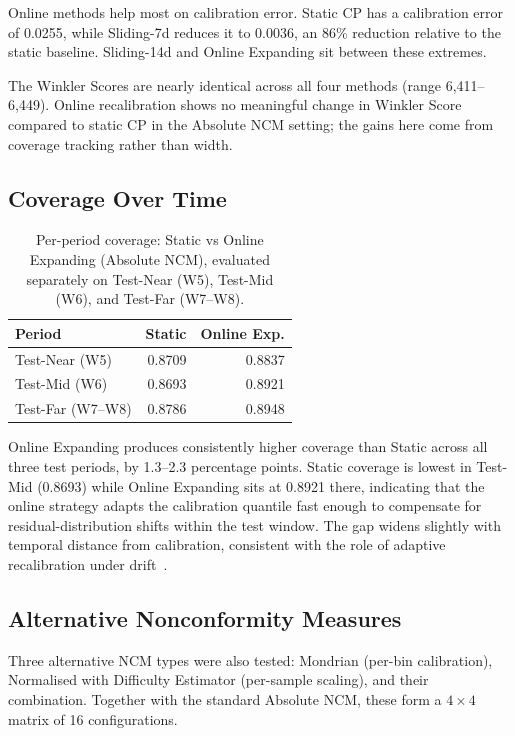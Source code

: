 \documentclass[12pt, a4paper, oneside]{report}
\begin{document}
Online methods help most on calibration error. Static CP has a calibration error of 0.0255, while Sliding-7d reduces it to 0.0036, an 86\% reduction relative to the static baseline. Sliding-14d and Online Expanding sit between these extremes.

The Winkler Scores are nearly identical across all four methods (range 6,411--6,449). Online recalibration shows no meaningful change in Winkler Score compared to static CP in the Absolute NCM setting; the gains here come from coverage tracking rather than width.

\subsection{Coverage Over Time}

\begin{table}[H]
\centering
\caption{Per-period coverage: Static vs Online Expanding (Absolute NCM), evaluated separately on Test-Near (W5), Test-Mid (W6), and Test-Far (W7--W8).}
\label{tab:exp2_period}
\begin{tabular}{lrr}
\toprule
\textbf{Period} & \textbf{Static} & \textbf{Online Exp.} \\
\midrule
Test-Near (W5) & 0.8709 & 0.8837 \\
Test-Mid (W6) & 0.8693 & 0.8921 \\
Test-Far (W7--W8) & 0.8786 & 0.8948 \\
\bottomrule
\end{tabular}
\end{table}

Online Expanding produces consistently higher coverage than Static across all three test periods, by 1.3--2.3 percentage points. Static coverage is lowest in Test-Mid (0.8693) while Online Expanding sits at 0.8921 there, indicating that the online strategy adapts the calibration quantile fast enough to compensate for residual-distribution shifts within the test window. The gap widens slightly with temporal distance from calibration, consistent with the role of adaptive recalibration under drift~\cite{Barber2023816}.

\subsection{Alternative Nonconformity Measures}

Three alternative NCM types were also tested: Mondrian (per-bin calibration), Normalised with Difficulty Estimator (per-sample scaling), and their combination. Together with the standard Absolute NCM, these form a $4 \times 4$ matrix of 16 configurations.
\end{document}
